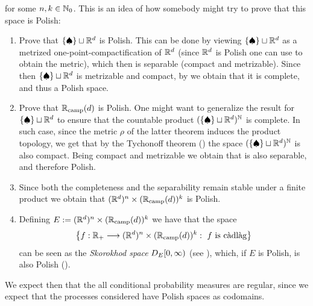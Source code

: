 for some $n,k \in \N_0$.
This is an idea of how somebody might try to prove that this space is Polish:
\begin{enumerate}
	\item Prove that $\{\spadesuit\} \sqcup \R^d$ is Polish.
	This can be done by viewing $\{\spadesuit\} \sqcup \R^d$ as a metrized one-point-compactification of $\R^d$ (since $\R^d$ is Polish one can use \cite[Theorem 5.3]{kechris} to obtain the metric), which then is separable (compact and metrizable).
	Since then $\{\spadesuit\} \sqcup \R^d$ is metrizable and compact, by \cite[Theorem 45.1]{munkres-2000} we obtain that it is complete, and thus a Polish space.
	\item Prove that $\confCamp(d)$ is Polish. 
	One might want to generalize the result \cite[Theorem 43.4]{munkres-2000} for $\{\spadesuit\} \sqcup \R^d$ to ensure that the countable product $(\{\spadesuit\} \sqcup \R^d)^\N$ is complete.
	In such case, since the metric $\rho$ of the latter theorem induces the product topology, we get that by the Tychonoff theorem (\cite[Theorem 37.3]{munkres-2000}) the space $(\{\spadesuit\} \sqcup \R^d)^\N$ is also compact.
	Being compact and metrizable we obtain that is also separable, and therefore Polish.
	\item Since both the completeness and the separability remain stable under a finite product we obtain that $(\R^d)^n\times(\confCamp(d))^k$ is Polish.
	\item Defining $E:=(\R^d)^n\times(\confCamp(d))^k$ we have that the space
	\begin{equation*}
		\left\{
		f:\R_+ \longrightarrow
		(\R^d)^n\times(\confCamp(d))^k
		:\
		f \text{ is \cadlag}
		\right\}
	\end{equation*}
	can be seen as the \emph{Skorokhod space} $\skorokhod{E}$ (see \cite[Chapter 3, Section 5]{kurtz}), which, if $E$ is Polish, is also Polish (\cite[Chapter 3, Theorem 5.6]{kurtz}).
\end{enumerate}

We expect then that the all conditional probability measures are regular, since we expect that the processes considered have Polish spaces as codomains.